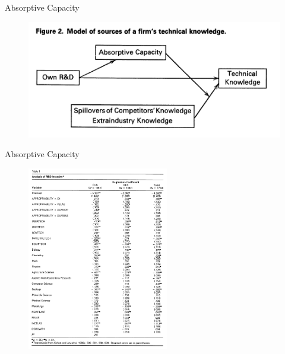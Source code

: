 \documentclass{beamer}
\begin{document}
\begin{frame}{Absorptive Capacity}{}
\begin{figure}[h]
\begin{centering}
  \includegraphics[width=\textwidth]{0402}
   \label{fig:0402}
\end{centering}
\end{figure}
\end{frame}

\begin{frame}{Absorptive Capacity}{}
\begin{figure}[h]
\begin{centering}
  \includegraphics[width=0.55\textwidth]{0403}
   \label{fig:0403}
\end{centering}
\end{figure}
\end{frame}



\end{document}
